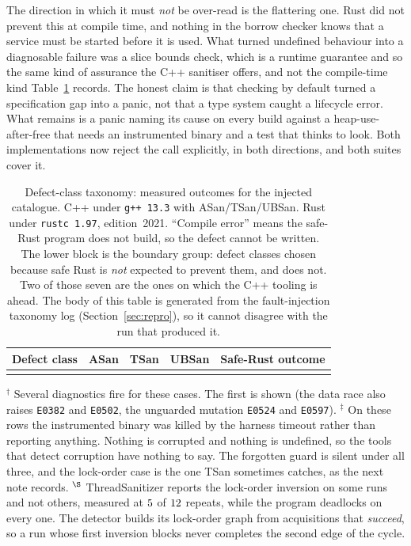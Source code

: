 \documentclass[english,oneside,a4paper,censored,csm,software-track-2020]{HYthesisML}
\begin{document}
The direction in which it must \emph{not} be over-read is the flattering one. Rust did not
prevent this at compile time, and nothing in the borrow checker knows that a service must be
started before it is used. What turned undefined behaviour into a diagnosable failure was a
slice bounds check, which is a runtime guarantee and so the same kind of assurance the C++
sanitiser offers, and not the compile-time kind Table~\ref{tab:taxonomy} records. The
honest claim is that checking by default turned a specification gap into a panic, not that a
type system caught a lifecycle error. What remains is a panic naming its cause on every build
against a heap-use-after-free that needs an instrumented binary and a test that thinks to look.
Both implementations now reject the call explicitly, in both directions, and both suites cover
it.

\begin{table}[tp]
\centering
\small
\caption[Defect-class taxonomy: measured outcomes]{Defect-class taxonomy: measured outcomes for the injected catalogue. C++ under
\texttt{g++~13.3} with ASan/TSan/UBSan. Rust under \texttt{rustc~1.97}, edition~2021. ``Compile
error'' means the safe-Rust program does not build, so the defect cannot be written. The lower
block is the boundary group: defect classes chosen because safe Rust is \emph{not} expected to
prevent them, and does not. Two of those seven are the ones on which the C++ tooling is ahead.
The body of this table is generated from the fault-injection taxonomy log
(Section~\ref{sec:repro}), so it cannot
disagree with the run that produced it.\label{tab:taxonomy}}
\footnotesize
\setlength{\tabcolsep}{4pt}
\begin{tabular}{@{}l l l l l@{}}
\hline\hline
Defect class & ASan & TSan & UBSan & Safe-Rust outcome \\
\hline
\\
\hline
\end{tabular}

\vspace{0.4em}
{\footnotesize\raggedright
$^{\dagger}$ Several diagnostics fire for these cases. The first is shown (the data race also
raises \texttt{E0382} and \texttt{E0502}, the unguarded mutation \texttt{E0524} and
\texttt{E0597}). \quad
$^{\ddagger}$ On these rows the instrumented binary was killed by the harness timeout rather
than reporting anything. Nothing is corrupted and nothing is undefined, so the tools that
detect corruption have nothing to say. The forgotten guard is silent under all three, and the
lock-order case is the one TSan sometimes catches, as the next note records. \quad
$^{\S}$ ThreadSanitizer reports the lock-order inversion on some runs and not others, measured at
$5$ of $12$ repeats, while the program deadlocks on
every one. The detector builds its lock-order graph from acquisitions that \emph{succeed}, so a
run whose first inversion blocks never completes the second edge of the cycle.\par}
\end{table}
\end{document}
